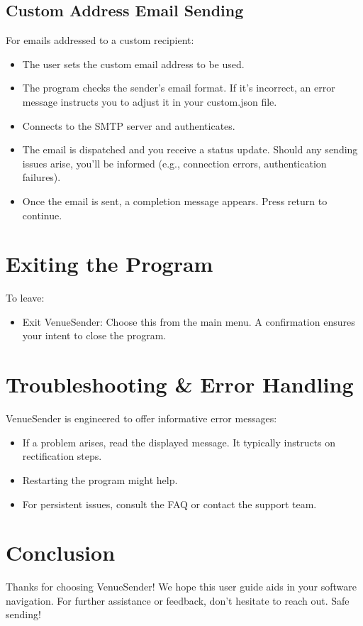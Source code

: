 \documentclass{article}
\begin{document}
	\subsection*{Custom Address Email Sending}
	For emails addressed to a custom recipient:
	\begin{itemize}
		\item The user sets the custom email address to be used.
		\item The program checks the sender's email format. If it's incorrect, an error message instructs you to adjust it in your custom.json file.
		\item Connects to the SMTP server and authenticates.
		\item The email is dispatched and you receive a status update. Should any sending issues arise, you'll be informed (e.g., connection errors, authentication failures).
		\item Once the email is sent, a completion message appears. Press return to continue.
	\end{itemize}
	
	\section*{Exiting the Program}
	To leave:
	\begin{itemize}
		\item Exit VenueSender: Choose this from the main menu. A confirmation ensures your intent to close the program.
	\end{itemize}
	
	\section*{Troubleshooting \& Error Handling}
	VenueSender is engineered to offer informative error messages:
	\begin{itemize}
		\item If a problem arises, read the displayed message. It typically instructs on rectification steps.
		\item Restarting the program might help.
		\item For persistent issues, consult the FAQ or contact the support team.
	\end{itemize}

	\section*{Conclusion}
	Thanks for choosing VenueSender! We hope this user guide aids in your software navigation. For further assistance or feedback, don't hesitate to reach out. Safe sending!
\newpage
\end{document}
